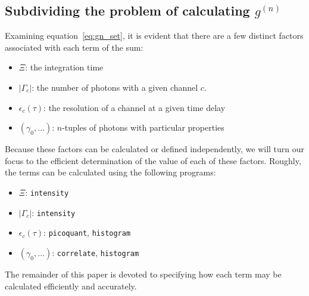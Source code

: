 \documentclass{article}
\newcommand{\picoquant}{\texttt{picoquant}}
\newcommand{\intensity}{\texttt{intensity}}
\newcommand{\correlate}{\texttt{correlate}}
\newcommand{\histogram}{\texttt{histogram}}
\newcommand{\gn}[1]{\ensuremath{g^{(#1)}}}
\newcommand{\abs}[1]{\ensuremath{\left|#1\right|}}
\newcommand{\channel}{\ensuremath{c}}
\newcommand{\photon}{\ensuremath{\gamma}}
\newcommand{\photons}{\ensuremath{\Gamma}}
\newcommand{\integrationtime}{\ensuremath{\Xi}}
\newcommand{\resolution}{\ensuremath{\epsilon}}
\begin{document}
\subsection{Subdividing the problem of calculating \gn{n}}
Examining equation~\ref{eq:gn_set}, it is evident that there are a few distinct factors associated with each term of the sum:
\begin{itemize}
\item $\integrationtime$: the integration time
\item $\abs{\photons_{c}}$: the number of photons with a given channel \channel.
\item $\resolution_{c}(\tau)$: the resolution of a channel at a given time delay
\item $(\photon_{0},\ldots)$: $n$-tuples of photons with particular properties
\end{itemize}
Because these factors can be calculated or defined independently, we will turn our focus to the efficient determination of the value of each of these factors. Roughly, the terms can be calculated using the following programs:
\begin{itemize}
\item $\integrationtime$: \intensity
\item $\abs{\photons_{c}}$: \intensity
\item $\resolution_{c}(\tau)$: \picoquant, \histogram
\item $(\photon_{0},\ldots)$: \correlate, \histogram
\end{itemize}
The remainder of this paper is devoted to specifying how each term may be calculated efficiently and accurately.

\end{document}
